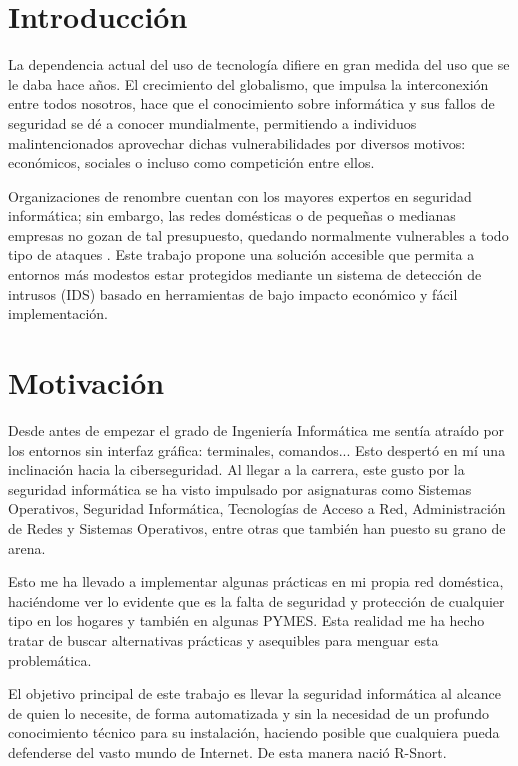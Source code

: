 \documentclass[11pt,a4paper,twoside]{report}
\begin{document}
\chapter*{Introducción}
La dependencia actual del uso de tecnología difiere en gran medida del uso que se le daba hace años. El crecimiento del globalismo, que impulsa la interconexión entre todos nosotros, hace que el conocimiento sobre informática y sus fallos de seguridad se dé a conocer mundialmente, permitiendo a individuos malintencionados aprovechar dichas vulnerabilidades por diversos motivos: económicos, sociales o incluso como competición entre ellos.\newline

Organizaciones de renombre cuentan con los mayores expertos en seguridad informática; sin embargo, las redes domésticas o de pequeñas o medianas empresas no gozan de tal presupuesto, quedando normalmente vulnerables a todo tipo de ataques \cite{enisa_smes}. Este trabajo propone una solución accesible que permita a entornos más modestos estar protegidos mediante un sistema de detección de intrusos (IDS) basado en herramientas de bajo impacto económico y fácil implementación.

\chapter{Motivación}
Desde antes de empezar el grado de Ingeniería Informática me sentía atraído por los entornos sin interfaz gráfica: terminales, comandos... Esto despertó en mí una inclinación hacia la ciberseguridad. Al llegar a la carrera, este gusto por la seguridad informática se ha visto impulsado por asignaturas como Sistemas Operativos, Seguridad Informática, Tecnologías de Acceso a Red, Administración de Redes y Sistemas Operativos, entre otras que también han puesto su grano de arena.\newline

Esto me ha llevado a implementar algunas prácticas en mi propia red doméstica, haciéndome ver lo evidente que es la falta de seguridad y protección de cualquier tipo en los hogares y también en algunas PYMES. Esta realidad me ha hecho tratar de buscar alternativas prácticas y asequibles para menguar esta problemática.\newline

El objetivo principal de este trabajo es llevar la seguridad informática al alcance de quien lo necesite, de forma automatizada y sin la necesidad de un profundo conocimiento técnico para su instalación, haciendo posible que cualquiera pueda defenderse del vasto mundo de Internet. De esta manera nació R-Snort.\newline
\end{document}
